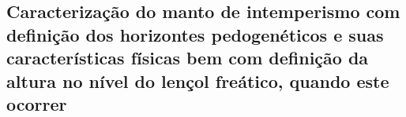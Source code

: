\subsection{Caracterização do manto de intemperismo com definição dos horizontes pedogenéticos e suas características físicas bem com definição da altura no nível do lençol freático, quando este ocorrer}
